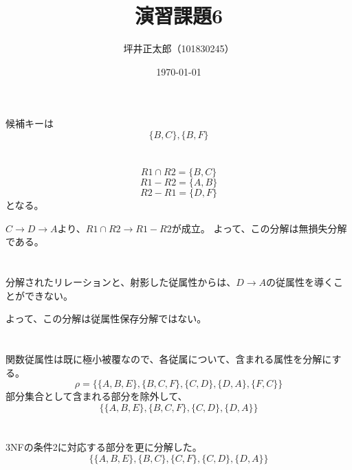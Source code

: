 \documentclass[a4paper,10pt]{jsarticle}
\begin{document}
\title{演習課題6}
\author{坪井正太郎（101830245）}
\date{\today}
\maketitle
\section{}
候補キーは
\[\{B,C\},\{B,F\}\]

\section{}
\[R1\cap R2 = \{B,C\}\]
\[R1 - R2 = \{A,B\}\]
\[R2 - R1 = \{D,F\}\]
となる。

$C\rightarrow D\rightarrow A$より、$R1\cap R2 \rightarrow R1 - R2$が成立。
よって、この分解は無損失分解である。

\section{}
分解されたリレーションと、射影した従属性からは、$D\rightarrow A$の従属性を導くことができない。

よって、この分解は従属性保存分解ではない。

\section{}
関数従属性は既に極小被覆なので、各従属について、含まれる属性を分解にする。
\[\rho = \{\{A,B,E\},\{B,C,F\},\{C,D\},\{D,A\},\{F,C\}\}\]
部分集合として含まれる部分を除外して、
\[\{\{A,B,E\},\{B,C,F\},\{C,D\},\{D,A\}\}\]

\section{}
3NFの条件2に対応する部分を更に分解した。
\[\{\{A,B,E\},\{B,C\},\{C,F\},\{C,D\},\{D,A\}\}\]
\end{document}

